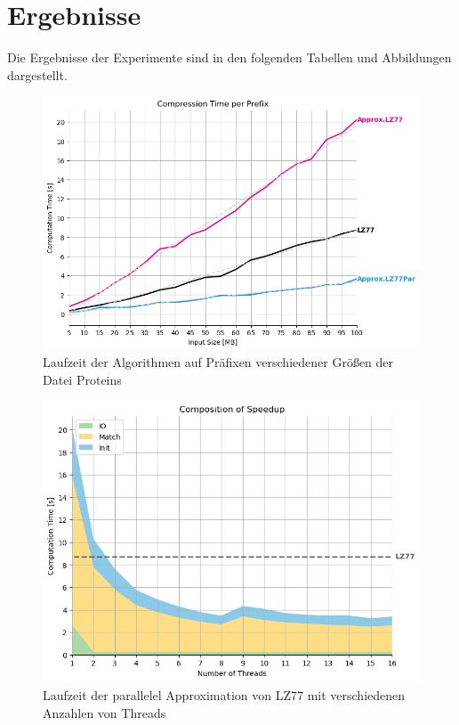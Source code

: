 \section{Ergebnisse}
Die Ergebnisse der Experimente sind in den folgenden Tabellen und Abbildungen dargestellt.

\begin{figure}
\centering
\caption{Laufzeit der Algorithmen auf Präfixen verschiedener Größen der Datei Proteins}
\includegraphics[scale=0.6]{bilder/progressive.png}
\end{figure}

\begin{figure}
    \centering
    \caption{Laufzeit der parallelel Approximation von LZ77 mit verschiedenen Anzahlen von Threads}
    \includegraphics[scale=0.6]{bilder/progressive_speedup_stack.png}
\end{figure}